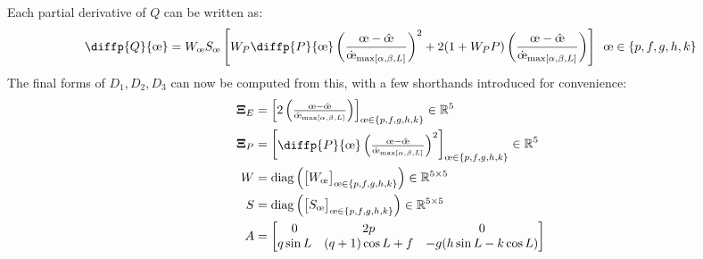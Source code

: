 Each partial derivative of $Q$ can be written as:
\begin{equation*}
    \diffp{Q}{{\moe}} = W_{\moe} S_{\moe} \left[ W_P\diffp{P}{{\moe}}\left(\frac{\moe - \hat{\moe}}{\dot{\moe}_{\maxrocall}} \right)^2 + 2 (1+W_P P) \left(\frac{\moe - \hat{\moe}}{\dot{\moe}_{\maxrocall}} \right) \right] \ \, \moe \in \{p, f, g, h, k\}
\end{equation*}
The final forms of $D_1, D_2, D_3$ can now be computed from this, with a few shorthands introduced for convenience:
\begin{align*}
    \boldsymbol{\Xi}_E & = \begin{bmatrix}
                               2  \left(\frac{\moe - \hat{\moe}}{\dot{\moe}_{\maxrocall}} \right)
                           \end{bmatrix}_{\moe \in \{p, f, g, h, k\}} \in \mathbb{R}^5                                                 \\
    \boldsymbol{\Xi}_P & = \begin{bmatrix}
                               \diffp{P}{{\moe}}\left(\frac{\moe - \hat{\moe}}{\dot{\moe}_{\maxrocall}} \right)^2
                           \end{bmatrix}_{\moe \in \{p, f, g, h, k\}} \in \mathbb{R}^5 \\
    W                  & = \mathrm{diag} \left(\begin{bmatrix}
                                                   W_{\moe}
                                               \end{bmatrix}_{\moe \in \{p, f, g, h, k\}} \right) \in \mathbb{R}^{5 \times 5}                                                                                              \\
    S                  & = \mathrm{diag} \left(\begin{bmatrix}
                                                   S_{\moe}
                                               \end{bmatrix}_{\moe \in \{p, f, g, h, k\}}\right)  \in \mathbb{R}^{5 \times 5}                                                                                              \\
    A                  & =
    \begin{bmatrix}
        0        & 2p               & 0                                 \\
        q\sin L  & (q+1) \cos L + f & -g(h \sin L - k \cos L)           \\

\end{bmatrix}
\end{align*}
